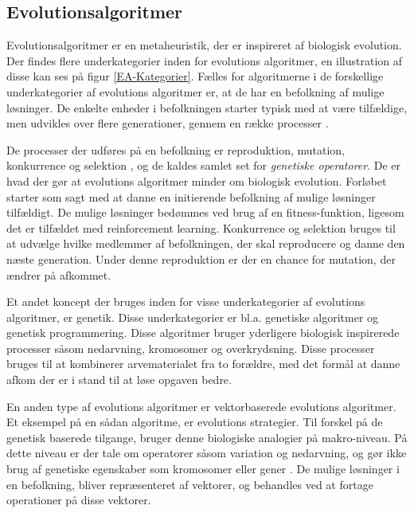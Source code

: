 \subsection{Evolutionsalgoritmer}\label{subsec:Evolutionsalgoritmer}
Evolutionsalgoritmer er en metaheuristik, der er inspireret af biologisk evolution. %
Der findes flere underkategorier inden for evolutions algoritmer, en illustration af disse kan ses på figur \ref{EA-Kategorier}. Fælles for algoritmerne i de forskellige underkategorier af evolutions algoritmer er, at de har en befolkning af mulige løsninger. De enkelte enheder i befolkningen starter typisk med at være tilfældige, men udvikles over flere generationer, gennem en række processer \cite{DBLP:journals/corr/abs-1805-11014}.
\par
De processer der udføres på en befolkning er reproduktion, mutation, konkurrence og selektion \cite{Back1999}, og de kaldes samlet set for \textit{genetiske operatorer}. De er hvad der gør at evolutions algoritmer minder om biologisk evolution. Forløbet starter som sagt med at danne en initierende befolkning af mulige løsninger tilfældigt. De mulige løsninger bedømmes ved brug af en fitness-funktion, ligesom det er tilfældet med reinforcement learning. Konkurrence og selektion bruges til at udvælge hvilke medlemmer af befolkningen, der skal reproducere og danne den næste generation. Under denne reproduktion er der en chance for mutation, der ændrer på afkommet.
\par
Et andet koncept der bruges inden for visse underkategorier af evolutions algoritmer, er genetik. Disse underkategorier er bl.a. genetiske algoritmer og genetisk programmering.
Disse algoritmer bruger yderligere biologisk inspirerede processer såsom nedarvning, kromosomer og overkrydsning. Disse processer bruges til at kombinerer arvematerialet fra to forældre, med det formål at danne afkom der er i stand til at løse opgaven bedre. 
\par
En anden type af evolutions algoritmer er vektorbaserede evolutions algoritmer. Et eksempel på en sådan algoritme, er evolutions strategier. Til forskel på de genetisk baserede tilgange, bruger denne biologiske analogier på makro-niveau. På dette niveau er der tale om operatorer såsom variation og nedarvning, og gør ikke brug af genetiske egenskaber som kromosomer eller gener \cite{Brownlee2011}. De mulige løsninger i en befolkning, bliver repræsenteret af vektorer, og behandles ved at fortage operationer på disse vektorer. 

